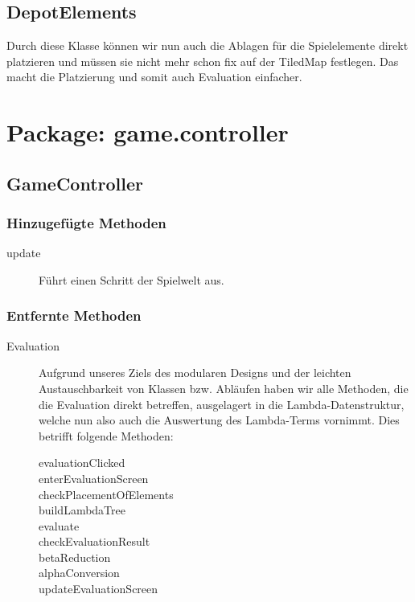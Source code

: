 \documentclass[parskip=full]{scrreprt}
\begin{document}
\subsection{DepotElements}
Durch diese Klasse können wir nun auch die Ablagen für die Spielelemente direkt platzieren und müssen sie nicht mehr schon fix auf der TiledMap festlegen. Das macht die Platzierung und somit auch Evaluation einfacher.

\section{Package: game.controller}

\subsection{GameController}

\subsubsection{Hinzugefügte Methoden}
\begin{description}
	\item[update] Führt einen Schritt der Spielwelt aus.
\end{description}

\subsubsection{Entfernte Methoden}
\begin{description}
	\item[Evaluation] Aufgrund unseres Ziels des modularen Designs und der leichten Austauschbarkeit von Klassen bzw. Abläufen haben wir alle Methoden, die die Evaluation direkt betreffen, ausgelagert in die Lambda-Datenstruktur, welche nun also auch die Auswertung des Lambda-Terms vornimmt. Dies betrifft folgende Methoden:
		\begin{description}
			\item[evaluationClicked]
			\item[enterEvaluationScreen]
			\item[checkPlacementOfElements]
			\item[buildLambdaTree]
			\item[evaluate]
			\item[checkEvaluationResult]
			\item[betaReduction]
			\item[alphaConversion]
			\item[updateEvaluationScreen]
		\end{description}
	
\end{description}
\end{document}
